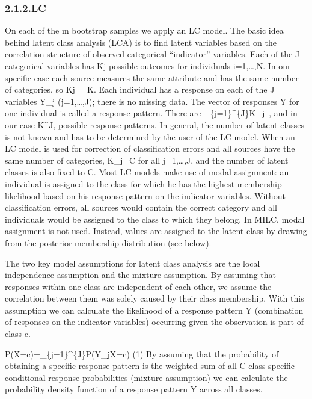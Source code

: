\documentclass[
]{article}
\begin{document}
\hypertarget{lc}{%
\subsubsection{2.1.2.LC}\label{lc}}

On each of the m bootstrap samples we apply an LC model. The basic idea
behind latent class analysis (LCA) is to find latent variables based on
the correlation structure of observed categorical ``indicator''
variables. Each of the J categorical variables has Kj possible outcomes
for individuals i=1,\ldots,N. In our specific case each source measures
the same attribute and has the same number of categories, so Kj = K.
Each individual has a response on each of the J variables Y\_j
\left(j=1,\ldots,J\right); there is no missing data. The vector of
responses Y for one individual is called a response pattern. There are
\prod\_\{j=1\}\^{}\{J\}K\_j~, and in our case K\^{}J, possible response
patterns. In general, the number of latent classes is not known and has
to be determined by the user of the LC model. When an LC model is used
for correction of classification errors and all sources have the same
number of categories, K\_j=C for all j=1,\ldots,J, and the number of
latent classes is also fixed to C. Most LC models make use of modal
assignment: an individual is assigned to the class for which he has the
highest membership likelihood based on his response pattern on the
indicator variables. Without classification errors, all sources would
contain the correct category and all individuals would be assigned to
the class to which they belong. In MILC, modal assignment is not used.
Instead, values are assigned to the latent class by drawing from the
posterior membership distribution (see below).

The two key model assumptions for latent class analysis are the local
independence assumption and the mixture assumption. By assuming that
responses within one class are independent of each other, we assume the
correlation between them was solely caused by their class membership.
With this assumption we can calculate the likelihood of a response
pattern Y (combination of responses on the indicator variables)
occurring given the observation is part of class c.~

P\left(\textbar X=c\right)=\prod\_\{j=1\}\^{}\{J\}P\left(Y\_j\textbar X=c\right)
(1) By assuming that the probability of obtaining a specific response
pattern is the weighted sum of all C class-specific conditional response
probabilities (mixture assumption) we can calculate the probability
density function of a response pattern Y across all classes.
\end{document}
